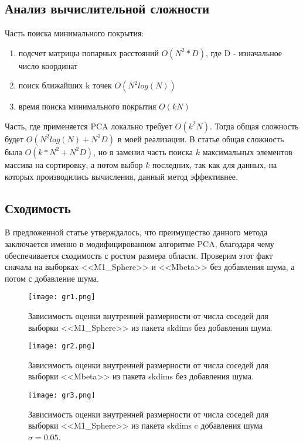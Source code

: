 \documentclass[english, russian]{sobraep}
\begin{document}
\subsection{Анализ вычислительной сложности}
Часть поиска минимального покрытия: 
    \begin{enumerate}
        \item подсчет матрицы попарных расстояний $O(N^2*D)$, где D - изначальное число координат
        \item поиск ближайших k точек $O(N^2log(N))$
        \item время поиска минимального покрытия $O(kN)$
    \end{enumerate}
Часть, где применяется PCA локально требует $O(k^2N)$. Тогда общая сложность будет $O(N^2log(N) + N^2D)$ в моей реализации. В статье общая сложность была $O(k * N^2 + N^2D)$, но я заменил часть поиска $k$ максимальных элементов массива на сортировку, а потом выбор $k$ последних, так как для данных, на которых производились вычисления, данный метод эффективнее.

\subsection{Сходимость}
В предложенной статье утверждалось, что преимущество данного метода заключается именно в модифицированном алгоритме PCA, благодаря чему обеспечивается сходимость с ростом размера области. Проверим этот факт сначала на выборках <<M1\_Sphere>> и <<Mbeta>> без добавления шума, а потом с добавление шума. 

\begin{figure}[H]
	\texttt{[image: gr1.png]}
	\centering
	\caption{Зависимость оценки внутренней размерности от числа соседей для выборки <<M1\_Sphere>> из пакета skdims без добавления шума.}
	\label{fig:fig1}
\end{figure}

\begin{figure}[H]
	\texttt{[image: gr2.png]}
	\centering
	\caption{Зависимость оценки внутренней размерности от числа соседей для выборки <<Mbeta>> из пакета skdims без добавления шума.}
	\label{fig:fig1}
\end{figure}

\begin{figure}[H]
	\texttt{[image: gr3.png]}
	\centering
	\caption{Зависимость оценки внутренней размерности от числа соседей для выборки <<M1\_Sphere>> из пакета skdims c добавления шума $\sigma = 0.05$.}
	\label{fig:fig1}
\end{figure}
\end{document}
